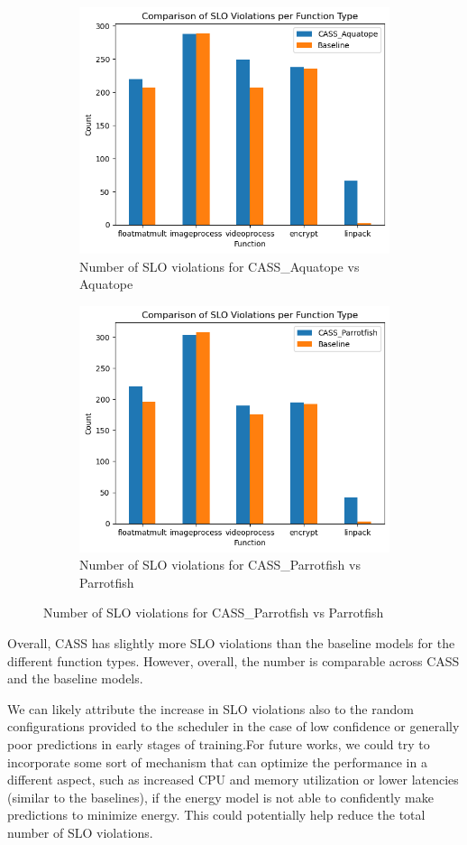\documentclass[times, 10pt,twocolumn]{article}
\begin{document}
\begin{figure}[H] %
   \centering
   \begin{subfigure}[b]{0.5\textwidth} %
         \centering
         \includegraphics[width=0.6\linewidth]{imgs/final_experiment_plots/duration_comparison/aquatope.png}
         \caption{Number of SLO violations for CASS\_Aquatope vs Aquatope}
         \label{fig:cassvsaquatope}
   \end{subfigure}
   \begin{subfigure}[b]{0.5\textwidth} %
         \centering
         \includegraphics[width=0.6\linewidth]{imgs/final_experiment_plots/duration_comparison/parrotfish.png}
         \caption{Number of SLO violations for CASS\_Parrotfish vs Parrotfish}
         \label{fig:cassvsparrotfish}
   \end{subfigure}
   \end{figure}

Overall, CASS has slightly more SLO violations than the baseline models for the different function types. However, overall, the number is comparable across CASS and the baseline models. 

We can likely attribute the increase in SLO violations also to the random configurations provided to the scheduler in the case of low confidence or generally poor predictions in early stages of training.For future works, we could try to incorporate some sort of mechanism that can optimize the performance in a different aspect, such as increased CPU and memory utilization or lower latencies (similar to the baselines), if the energy model is not able to confidently make predictions to minimize energy. This could potentially help reduce the total number of SLO violations. 
\end{document}
